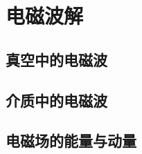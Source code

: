

\section{电磁波解}\label{20-2}

\subsection{真空中的电磁波}\label{20-2-1}

\subsection{介质中的电磁波}\label{20-2-2}

\subsection{电磁场的能量与动量}\label{20-2-3}